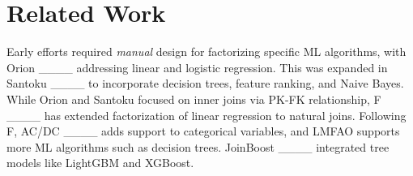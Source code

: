 \section{Related Work}
\label{sec:rw}


\vspace{-2mm}
Early efforts required \emph{manual} design for factorizing specific ML algorithms, with Orion ____ addressing linear and logistic regression. 
This was expanded in Santoku ____ to incorporate decision trees, feature ranking, and Naive Bayes. 
While Orion and Santoku focused on inner joins via PK-FK relationship,  F ____ has extended factorization of linear regression to natural joins. Following F, AC/DC ____ adds support to categorical variables, and LMFAO supports more ML algorithms such as decision trees. JoinBoost ____ integrated tree models like LightGBM and XGBoost.



 
